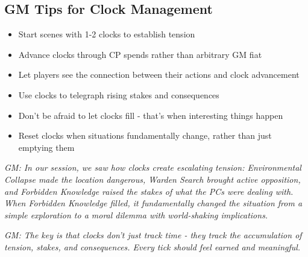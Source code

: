 \documentclass[11pt]{article}
\newcommand{\gm}[1]{\textit{GM: #1}}
\begin{document}
\subsection*{GM Tips for Clock Management}

\begin{itemize}[leftmargin=*]
\item Start scenes with 1-2 clocks to establish tension
\item Advance clocks through CP spends rather than arbitrary GM fiat
\item Let players see the connection between their actions and clock advancement
\item Use clocks to telegraph rising stakes and consequences
\item Don't be afraid to let clocks fill - that's when interesting things happen
\item Reset clocks when situations fundamentally change, rather than just emptying them
\end{itemize}

\gm{In our session, we saw how clocks create escalating tension: Environmental Collapse made the location dangerous, Warden Search brought active opposition, and Forbidden Knowledge raised the stakes of what the PCs were dealing with. When Forbidden Knowledge filled, it fundamentally changed the situation from a simple exploration to a moral dilemma with world-shaking implications.}

\gm{The key is that clocks don't just track time - they track the accumulation of tension, stakes, and consequences. Every tick should feel earned and meaningful.}
\end{document}
